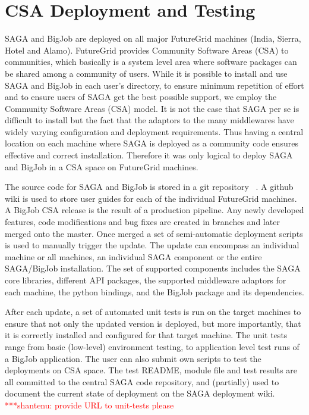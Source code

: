 \documentclass[]{paper}
\newcommand{\jhanote}[1]{ {\textcolor{red} { ***shantenu: #1 }}}
\newcommand{\jhanote}[1]{}
\begin{document}
\section{CSA Deployment and Testing}
SAGA and BigJob are deployed on all major FutureGrid machines (India,
Sierra, Hotel and Alamo).  FutureGrid provides Community Software
Areas (CSA) to communities, which basically is a system level area
where software packages can be shared among a community of users.
While it is possible to install and use SAGA and BigJob in each user's
directory, to ensure minimum repetition of effort and to ensure users
of SAGA get the best possible support, we employ the Community
Software Areas (CSA) model.  It is not the case that SAGA per se is
difficult to install but the fact that the adaptors to the many
middlewares have widely varying configuration and deployment
requirements.  Thus having a central location on each machine where
SAGA is deployed as a community code ensures effective and correct
installation.  Therefore it was only logical to deploy SAGA and BigJob
in a CSA space on FutureGrid machines.

The source code for SAGA and BigJob is stored in a git repository
~\cite{bigjob_web}. 
A github wiki is used to store user guides for
each of the individual FutureGrid machines. A BigJob CSA release is
the result of a production pipeline. Any newly developed features,
code modifications and bug fixes are created in branches and later
merged onto the master. Once merged a set of semi-automatic deployment
scripts is used to manually trigger the update. The update can
encompass an individual machine or all machines, an individual SAGA
component or the entire SAGA/BigJob installation. The set of supported
components includes the SAGA core libraries, different API packages,
the supported middleware adaptors for each machine, the python
bindings, and the BigJob package and its dependencies.

After each update, a set of automated unit tests is run on the target
machines to ensure that not only the updated version is deployed, but
more importantly, that it is correctly installed and configured for
that target machine. The unit tests range from basic (low-level)
environment testing, to application level test runs of a BigJob
application. The user can also submit own scripts to test the
deployments on CSA space. The test README, module file and test
results are all committed to the central SAGA code repository, and
(partially) used to document the current state of deployment on the
SAGA deployment wiki.  \jhanote{provide URL to unit-tests please}
\end{document}
